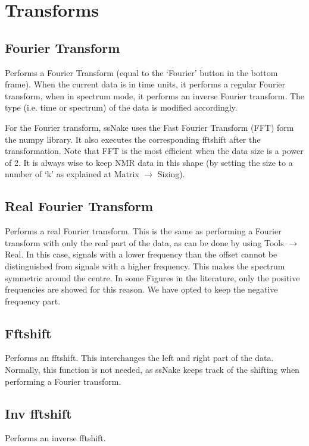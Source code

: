 \documentclass[11pt,a4paper]{article}
\begin{document}
\section{Transforms}
\subsection{Fourier Transform}
Performs a Fourier Transform (equal to the `Fourier' button in the bottom frame). When the current data is in time units,
it performs a regular Fourier transform, when in spectrum mode, it performs an inverse Fourier transform.
The type (i.e. time or spectrum) of the data is modified accordingly.

For the Fourier transform, ssNake uses the Fast Fourier Transform (FFT) form the numpy library. It also executes the
corresponding fftshift after the transformation. Note that FFT is the most efficient when the data size is a power of 2.
It is always wise to keep NMR data in this shape (by setting the size to a number of `k' as explained at Matrix $\rightarrow$ Sizing).



\subsection{Real Fourier Transform}
Performs a real Fourier transform. This is the same as performing a Fourier transform with only the real part of the data, as can be
done by using Tools $\rightarrow$ Real. In this case, signals with a lower frequency than the offset cannot be distinguished
from signals with a higher frequency. This makes the spectrum symmetric around the centre. In some Figures in the literature, only
the positive frequencies are showed for this reason. We have opted to keep the negative frequency part.



\subsection{Fftshift}
Performs an fftshift. This interchanges the left and right part of the data. Normally, this function is not needed, as ssNake keeps
track of the shifting when performing a Fourier transform.


\subsection{Inv fftshift}
Performs an inverse fftshift.
\end{document}

